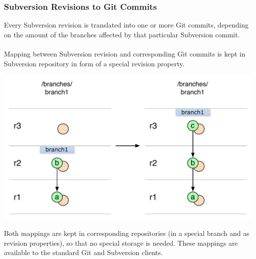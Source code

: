 \subsubsection{Subversion Revisions to Git Commits}

Every Subversion revision is translated into one or more Git commits, depending on the amount of the branches affected by that particular Subversion commit.\\\\%
Mapping between Subversion revision and corresponding Git commits is kept in Subversion repository in form of a special revision property.
\begin{center}
\includegraphics[width=\textwidth]{img/diagrams/single_change_svn_to_git.pdf}%
\label{simple_svn_to_git}%
\end{center}
Both mappings are kept in corresponding repositories (in a special branch and as revision properties), so that no special storage is needed. 
These mappings are available to the standard Git and Subversion clients.